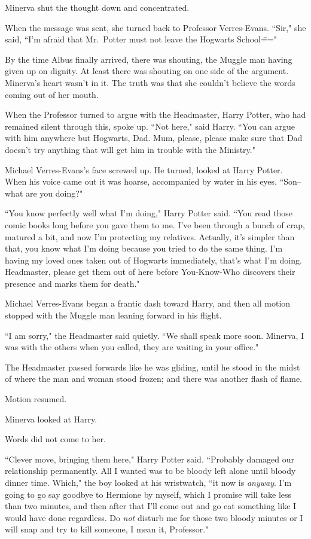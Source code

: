 Minerva shut the thought down and concentrated.

When the message was sent, she turned back to Professor Verres-Evans. ``Sir," she said, ``I'm afraid that Mr.~Potter must not leave the Hogwarts School\==="

By the time Albus finally arrived, there was shouting, the Muggle man having given up on dignity. At least there was shouting on one side of the argument. Minerva's heart wasn't in it. The truth was that she couldn't believe the words coming out of her mouth.

When the Professor turned to argue with the Headmaster, Harry Potter, who had remained silent through this, spoke up. ``Not here," said Harry. ``You can argue with him anywhere but Hogwarts, Dad. Mum, please, please make sure that Dad doesn't try anything that will get him in trouble with the Ministry."

Michael Verres-Evans's face screwed up. He turned, looked at Harry Potter. When his voice came out it was hoarse, accompanied by water in his eyes. ``Son\---what are you doing?"

``You know perfectly well what I'm doing," Harry Potter said. ``You read those comic books long before you gave them to me. I've been through a bunch of crap, matured a bit, and now I'm protecting my relatives. Actually, it's simpler than that, you know what I'm doing because you tried to do the same thing. I'm having my loved ones taken out of Hogwarts immediately, that's what I'm doing. Headmaster, please get them out of here before You-Know-Who discovers their presence and marks them for death."

Michael Verres-Evans began a frantic dash toward Harry, and then all motion stopped with the Muggle man leaning forward in his flight.

``I am sorry," the Headmaster said quietly. ``We shall speak more soon. Minerva, I was with the others when you called, they are waiting in your office."

The Headmaster passed forwards like he was gliding, until he stood in the midst of where the man and woman stood frozen; and there was another flash of flame.

Motion resumed.

Minerva looked at Harry.

Words did not come to her.

``Clever move, bringing them here," Harry Potter said. ``Probably damaged our relationship permanently. All I wanted was to be bloody left alone until bloody dinner time. Which," the boy looked at his wristwatch, ``it now is \emph{anyway}. I'm going to go say goodbye to Hermione by myself, which I promise will take less than two minutes, and then after that I'll come out and go eat something like I would have done regardless. Do \emph{not} disturb me for those two bloody minutes or I will snap and try to kill someone, I mean it, Professor."

